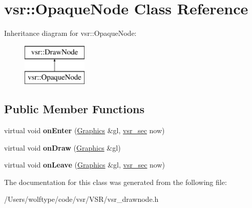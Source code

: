 \hypertarget{classvsr_1_1_opaque_node}{\section{vsr\-:\-:Opaque\-Node Class Reference}
\label{classvsr_1_1_opaque_node}
}
Inheritance diagram for vsr\-:\-:Opaque\-Node\-:\begin{figure}[H]
\begin{center}
\leavevmode
\includegraphics[height=2.000000cm]{classvsr_1_1_opaque_node}
\end{center}
\end{figure}
\subsection*{Public Member Functions}
\begin{DoxyCompactItemize}
\item 
\hypertarget{classvsr_1_1_opaque_node_a7caa5838397497c16de95b2da562d19b}{virtual void {\bfseries on\-Enter} (\hyperlink{classvsr_1_1_graphics}{Graphics} \&gl, \hyperlink{classvsr_1_1vsr__sec}{vsr\-\_\-sec} now)}\label{classvsr_1_1_opaque_node_a7caa5838397497c16de95b2da562d19b}

\item 
\hypertarget{classvsr_1_1_opaque_node_a7f782fc2425cf71f139d8137804d2f1f}{virtual void {\bfseries on\-Draw} (\hyperlink{classvsr_1_1_graphics}{Graphics} \&gl)}\label{classvsr_1_1_opaque_node_a7f782fc2425cf71f139d8137804d2f1f}

\item 
\hypertarget{classvsr_1_1_opaque_node_af76fab81d289ad5b751ba76c235e0c53}{virtual void {\bfseries on\-Leave} (\hyperlink{classvsr_1_1_graphics}{Graphics} \&gl, \hyperlink{classvsr_1_1vsr__sec}{vsr\-\_\-sec} now)}\label{classvsr_1_1_opaque_node_af76fab81d289ad5b751ba76c235e0c53}

\end{DoxyCompactItemize}


The documentation for this class was generated from the following file\-:\begin{DoxyCompactItemize}
\item 
/\-Users/wolftype/code/vsr/\-V\-S\-R/vsr\-\_\-drawnode.\-h\end{DoxyCompactItemize}
